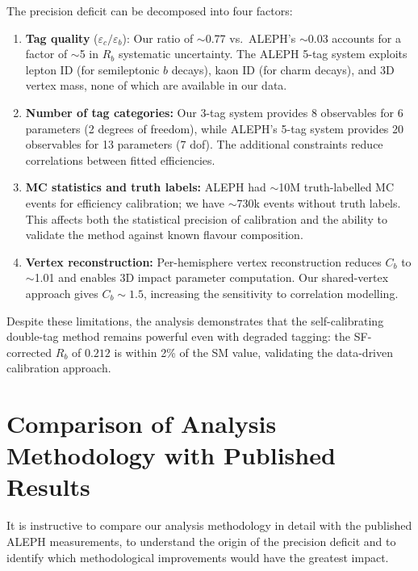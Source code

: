\documentclass[11pt,a4paper]{article}
\begin{document}
The precision deficit can be decomposed into four factors:
\begin{enumerate}
\item \textbf{Tag quality} ($\varepsilon_c/\varepsilon_b$):
  Our ratio of $\sim$0.77 vs.\ ALEPH's $\sim$0.03 accounts for
  a factor of $\sim$5 in $R_b$ systematic uncertainty.
  The ALEPH 5-tag system exploits lepton ID (for semileptonic
  $b$ decays), kaon ID (for charm decays), and 3D vertex mass,
  none of which are available in our data.

\item \textbf{Number of tag categories:}
  Our 3-tag system provides 8 observables for 6 parameters (2
  degrees of freedom), while ALEPH's 5-tag system provides 20
  observables for 13 parameters (7 dof).
  The additional constraints reduce correlations between
  fitted efficiencies.

\item \textbf{MC statistics and truth labels:}
  ALEPH had $\sim$10M truth-labelled MC events for efficiency
  calibration; we have $\sim$730k events without truth labels.
  This affects both the statistical precision of calibration and
  the ability to validate the method against known flavour
  composition.

\item \textbf{Vertex reconstruction:}
  Per-hemisphere vertex reconstruction reduces $C_b$ to $\sim$1.01
  and enables 3D impact parameter computation.
  Our shared-vertex approach gives $C_b \sim 1.5$, increasing the
  sensitivity to correlation modelling.
\end{enumerate}

Despite these limitations, the analysis demonstrates that the
self-calibrating double-tag method remains powerful even with
degraded tagging: the SF-corrected $R_b$ of $0.212$ is within
2\% of the SM value, validating the data-driven calibration
approach.

\section{Comparison of Analysis Methodology with Published Results}
\label{sec:method_comparison}

It is instructive to compare our analysis methodology in detail
with the published ALEPH measurements, to understand the origin
of the precision deficit and to identify which methodological
improvements would have the greatest impact.
\end{document}
